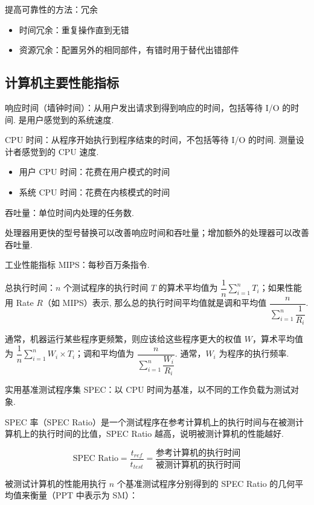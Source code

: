 \documentclass[cn, hazy, blue, normal, 12pt]{elegantnote}
\begin{document}
提高可靠性的方法：冗余

\begin{itemize}
    \item 时间冗余：重复操作直到无错
    \item 资源冗余：配置另外的相同部件，有错时用于替代出错部件
\end{itemize}

\subsection{计算机主要性能指标}

响应时间（墙钟时间）：从用户发出请求到得到响应的时间，包括等待 I/O 的时间. 是用户感觉到的系统速度.

CPU 时间：从程序开始执行到程序结束的时间，不包括等待 I/O 的时间. 测量设计者感觉到的 CPU 速度.

\begin{itemize}
    \item 用户 CPU 时间：花费在用户模式的时间
    \item 系统 CPU 时间：花费在内核模式的时间
\end{itemize}

吞吐量：单位时间内处理的任务数.

处理器用更快的型号替换可以改善响应时间和吞吐量；增加额外的处理器可以改善吞吐量.

工业性能指标 MIPS：每秒百万条指令.

总执行时间：$n$ 个测试程序的执行时间 $T$ 的算术平均值为 $\dfrac{1}{n}\sum\limits_{i=1}^{n}T_i$；如果性能用 Rate $R$（如 MIPS）表示, 那么总的执行时间平均值就是调和平均值 $\dfrac{n}{\sum\limits_{i=1}^{n}\dfrac{1}{R_i}}$.

通常，机器运行某些程序更频繁，则应该给这些程序更大的权值 $W$，算术平均值为 $\dfrac{1}{n}\sum\limits_{i=1}^{n}W_i \times T_i$；调和平均值为 $\dfrac{n}{\sum\limits_{i=1}^{n} \dfrac{W_i}{R_i}}$. 通常，$W_i$ 为程序的执行频率.

实用基准测试程序集 SPEC：以 CPU 时间为基准，以不同的工作负载为测试对象.

SPEC 率（SPEC Ratio）是一个测试程序在参考计算机上的执行时间与在被测计算机上的执行时间的比值，SPEC Ratio 越高，说明被测计算机的性能越好.

$$
    \text{SPEC Ratio} = \dfrac{t_{ref}}{t_{test}} = \dfrac{\text{参考计算机的执行时间}}{\text{被测计算机的执行时间}}
$$

被测试计算机的性能用执行 $n$ 个基准测试程序分别得到的 SPEC Ratio 的几何平均值来衡量（PPT 中表示为 SM）：
\end{document}
